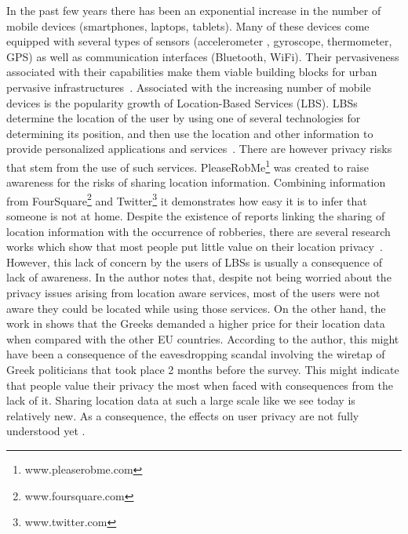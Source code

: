 In the past few years there has been an exponential increase in the
number of mobile devices (smartphones, laptops, tablets). Many of
these devices come equipped with several types of sensors
(accelerometer , gyroscope, thermometer, GPS) as well as communication
interfaces (Bluetooth, WiFi). Their pervasiveness associated with
their capabilities make them viable building blocks for urban
pervasive infrastructures~\cite{kostakos2009understanding}. Associated
with the increasing number of mobile devices is the popularity growth
of Location-Based Services (LBS)\cite{zickuhr2012three}. LBSs
determine the location of the user by using one of several
technologies for determining its position, and then use the location and
other information to provide personalized applications and
services~\cite{zibuschka2011location}. There are however privacy risks
that stem from the use of such services.
PleaseRobMe\footnote{www.pleaserobme.com} was created to raise awareness
for the risks of sharing location information. Combining information
from FourSquare\footnote{www.foursquare.com} and
Twitter\footnote{www.twitter.com} it demonstrates how easy it is to
infer that someone is not at home. Despite the existence of reports
linking the sharing of location information with the occurrence of
robberies\cite{Grove:2009:Online,Dybwad:2009:Online}, there are
several research works which show that most people put little value on
their location privacy~\cite{ahern2007over,colbert2001diary,
  Cvrcek:2006:SVL:1179601.1179621,kaasinen2003user}. However, this
lack of concern by the users of LBSs is usually a consequence of lack
of awareness. In \cite{kaasinen2003user} the author notes that,
despite not being worried about the privacy issues arising from location aware
services, most of the users were not aware they could be located while
using those services. On the other hand, the work in
\cite{Cvrcek:2006:SVL:1179601.1179621} shows that the Greeks demanded
a higher price for their location data when compared with the other EU
countries. According to the author, this might have been a consequence
of the eavesdropping scandal involving the wiretap of Greek
politicians that took place 2 months before the survey. This might
indicate that people value their privacy the most when faced with
consequences from the lack of it. Sharing location data at such a
large scale like we see today is relatively new. As a consequence, the
effects on user privacy are not fully understood
yet \cite{Terrovitis:2011:PPD:2031331.2031334}.

